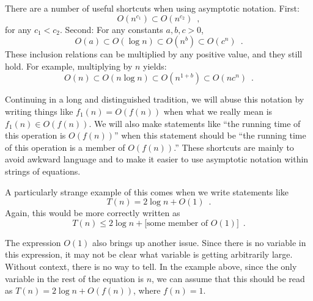 There are a number of useful shortcuts when using asymptotic notation.  First:
\[ O(n^{c_1}) \subset O(n^{c_2}) \enspace ,\]
 for any $c_1 < c_2$.  Second:
For any constants $a,b,c > 0$,
\[ O(a) \subset O(\log n) \subset O(n^{b}) \subset O({c}^n) \enspace . \]
These inclusion relations can be multiplied by any positive value, and they still hold. For example, multiplying by $n$ yields:
\[ O(n) \subset O(n\log n) \subset O(n^{1+b}) \subset O(n{c}^n) \enspace . \]

Continuing in a long and distinguished tradition,
we will abuse this notation by writing things
like $f_1(n) = O(f(n))$ when what we really mean is $f_1(n) \in O(f(n))$.
We will also make statements like ``the running time of this operation
is $O(f(n))$'' when this statement should be ``the running time of
this operation is a member of $O(f(n))$.''  These shortcuts are mainly
to avoid awkward language and to make it easier to use asymptotic
notation within strings of equations.

A particularly strange example of this comes when we write statements like
\[
     T(n) = 2\log n + O(1)  \enspace .
\]
Again, this would be more correctly written as
\[
     T(n) \le 2\log n + [\mbox{some member of $O(1)$]}  \enspace .
\]

The expression $O(1)$ also brings up another issue. Since there is
no variable in this expression, it may not be clear what variable is
getting arbitrarily large.  Without context, there is no way to tell.
In the example above, since the only variable in the rest of the equation
is $n$, we can assume that this should be read as $T(n) = 2\log n + O(f(n))$,
where $f(n) = 1$.

